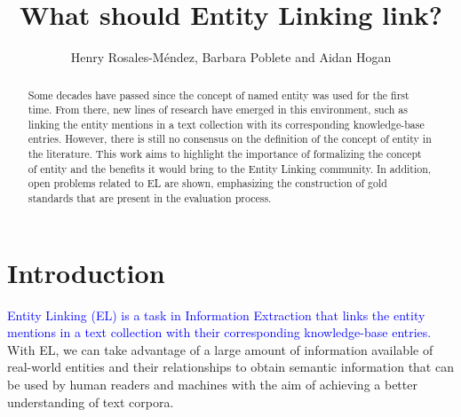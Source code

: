 \documentclass{llncs}
\begin{document}
\title{What should Entity Linking link?}
%
%
\author{Henry Rosales-M\'endez, Barbara Poblete and Aidan Hogan}
%
%
%

\maketitle              %
\begin{abstract}
Some decades have passed since the concept of named entity was used for the first time. From there, new lines of research have emerged in this environment, such as linking the entity mentions in a text collection with its corresponding knowledge-base entries. However, there is still no consensus on the definition of the concept of entity in the literature. This work aims to highlight the importance of formalizing the concept of entity and the benefits it would bring to the Entity Linking community. In addition, open problems related to EL are shown, emphasizing the construction of gold standards that are present in the evaluation process.

\end{abstract}




\section{Introduction}
\label{sec:intro}

\textcolor{blue}{Entity Linking (EL) is a task in Information Extraction that links the entity mentions in a text collection with their corresponding knowledge-base entries.} With EL, we can take advantage of a large amount of information available of real-world entities and their relationships to obtain semantic information that can be used by human readers and machines with the aim of achieving a better understanding of text corpora. 
\end{document}
